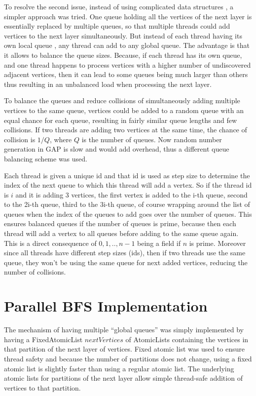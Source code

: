 \documentclass{report}
\theoremstyle{plain}
\theoremstyle{definition}
\theoremstyle{remark}
\begin{document}
To resolve the second issue, instead of using complicated data structures \cite{Leiserson}, a simpler approach was tried. One queue holding all the vertices of the next layer is essentially replaced by multiple queues, so that multiple threads could add vertices to the next layer simultaneously. But instead of each thread having its own local queue \cite{cong2008solving, zhang2006parallel}, any thread can add to any global queue. The advantage is that it allows to balance the queue sizes. Because, if each thread has its own queue, and one thread happens to process vertices with a higher number of undiscovered adjacent vertices, then it can lead to some queues being much larger than others thus resulting in an unbalanced load when processing the next layer.

To balance the queues and reduce collisions of simultaneously adding multiple vertices to the same queue, vertices could be added to a random queue with an equal chance for each queue, resulting in fairly similar queue lengths and few collisions. If two threads are adding two vertices at the same time, the chance of collision is $1/Q$, where $Q$ is the number of queues. Now random number generation in GAP is slow and would add overhead, thus a different queue balancing scheme was used.

Each thread is given a unique id and that id is used as step size to determine the index of the next queue to which this thread will add a vertex. So if the thread id is $i$ and it is adding 3 vertices, the first vertex is added to the i-th queue, second to the 2i-th queue, third to the 3i-th queue, of course wrapping around the list of queues when the index of the queues to add goes over the number of queues. This ensures balanced queues if the number of queues is prime, because then each thread will add a vertex to all queues before adding to the same queue again. This is a direct consequence of ${0, 1,..,n-1}$ being a field if $n$ is prime. Moreover since all threads have different step sizes (ids), then if two threads use the same queue, they won't be using the same queue for next added vertices, reducing the number of collisions.

\section{Parallel BFS Implementation}

The mechanism of having multiple ``global queues'' was simply implemented by having a FixedAtomicList $nextVertices$ of AtomicLists containing the vertices in that partition of the next layer of vertices. Fixed atomic list was used to ensure thread safety and because the number of partitions does not change, using a fixed atomic list is slightly faster than using a regular atomic list. The underlying atomic lists for partitions of the next layer allow simple thread-safe addition of vertices to that partition.
\end{document}
